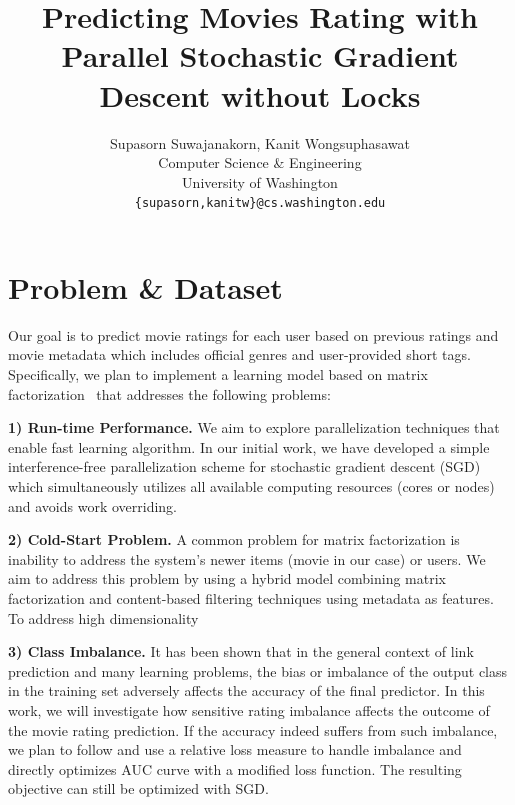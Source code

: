 \documentclass{article} %
\title{Predicting Movies Rating with Parallel Stochastic Gradient Descent without Locks}
\author{
Supasorn Suwajanakorn, Kanit Wongsuphasawat \\
Computer Science \& Engineering\\
University of Washington\\
\texttt{\{supasorn,kanitw\}@cs.washington.edu} \\
}
\begin{document}
\maketitle


\section{Problem \& Dataset}

Our goal is to predict movie ratings for each user based on previous ratings and movie metadata which includes official genres and user-provided short tags.  Specifically, we plan to implement a learning model based on matrix factorization~\cite{koren:matrix} that addresses the following problems:

\textbf{1) Run-time Performance.}  We aim to explore parallelization techniques that enable fast learning algorithm.  In our initial work, we have developed a simple interference-free parallelization scheme for stochastic gradient descent (SGD) which simultaneously utilizes all available computing resources (cores or nodes) and avoids work overriding.


\textbf{2) Cold-Start Problem.}  A common problem for matrix factorization is inability to address the system’s  newer items (movie in our case) or users.  We aim to address this problem by using a hybrid model combining matrix factorization and content-based filtering techniques using metadata as features.  To address high dimensionality

\textbf{3) Class Imbalance.}  It has been shown that in the general context of link prediction and many learning problems, the bias or imbalance of the output class in the training set adversely affects the accuracy of the final predictor. In this work, we will investigate how sensitive rating imbalance affects the outcome of the movie rating prediction. If the accuracy indeed suffers from such imbalance, we plan to follow \cite{menon:link-prediction} and use a relative loss measure to handle imbalance and directly optimizes AUC curve with a modified loss function. The resulting objective can still be optimized with SGD.
\end{document}
